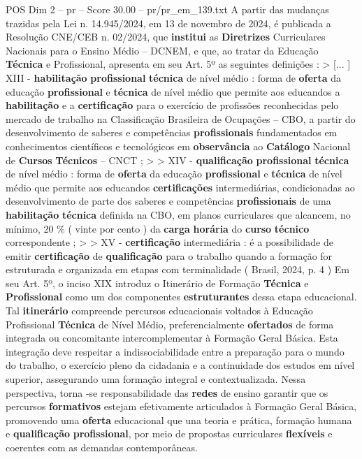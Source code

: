 \begin{textsample}{POS Dim 2 – pr – Score 30.00 – pr/pr\_em\_139.txt}
A partir das mudanças trazidas pela Lei n. 14.945/2024, em 13 de novembro de 2024, é publicada a Resolução CNE/CEB n. 02/2024, que \textbf{institui} as \textbf{Diretrizes} Curriculares Nacionais para o Ensino Médio – DCNEM, e que, ao tratar da Educação \textbf{Técnica} e Profissional, apresenta em seu Art. 5º as seguintes definições : > [... ] XIII - \textbf{habilitação} \textbf{profissional} \textbf{técnica} de nível médio : forma de \textbf{oferta} da educação \textbf{profissional} e \textbf{técnica} de nível médio que permite aos educandos a \textbf{habilitação} e a \textbf{certificação} para o exercício de profissões reconhecidas pelo mercado de trabalho na Classificação Brasileira de Ocupações – CBO, a partir do desenvolvimento de saberes e competências \textbf{profissionais} fundamentados em conhecimentos científicos e tecnológicos em \textbf{observância} ao \textbf{Catálogo} Nacional de \textbf{Cursos} \textbf{Técnicos} – CNCT ; > > XIV - \textbf{qualificação} \textbf{profissional} \textbf{técnica} de nível médio : forma de \textbf{oferta} da educação \textbf{profissional} e \textbf{técnica} de nível médio que permite aos educandos \textbf{certificações} intermediárias, condicionadas ao desenvolvimento de parte dos saberes e competências \textbf{profissionais} de uma \textbf{habilitação} \textbf{técnica} definida na CBO, em planos curriculares que alcancem, no mínimo, 20 \% ( vinte por cento ) da \textbf{carga} \textbf{horária} do \textbf{curso} \textbf{técnico} correspondente ; > > XV - \textbf{certificação} intermediária : é a possibilidade de emitir \textbf{certificação} de \textbf{qualificação} para o trabalho quando a formação for estruturada e organizada em etapas com terminalidade ( Brasil, 2024, p. 4 ) Em seu Art. 5º, o inciso XIX introduz o Itinerário de Formação \textbf{Técnica} e \textbf{Profissional} como um dos componentes \textbf{estruturantes} dessa etapa educacional.
Tal \textbf{itinerário} compreende percursos educacionais voltados à Educação Profissional \textbf{Técnica} de Nível Médio, preferencialmente \textbf{ofertados} de forma integrada ou concomitante intercomplementar à Formação Geral Básica.
Esta integração deve respeitar a indissociabilidade entre a preparação para o mundo do trabalho, o exercício pleno da cidadania e a continuidade dos estudos em nível superior, assegurando uma formação integral e contextualizada.
Nessa perspectiva, torna -se responsabilidade das \textbf{redes} de ensino garantir que os percursos \textbf{formativos} estejam efetivamente articulados à Formação Geral Básica, promovendo uma \textbf{oferta} educacional que una teoria e prática, formação humana e \textbf{qualificação} \textbf{profissional}, por meio de propostas curriculares \textbf{flexíveis} e coerentes com as demandas contemporâneas.

\end{textsample}
